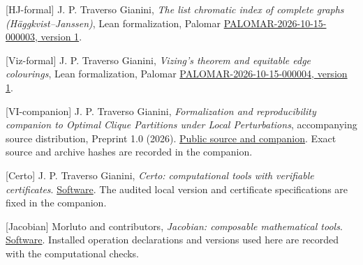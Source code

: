 \documentclass[english,11pt,a4paper]{article}
\begin{document}
{[}HJ-formal{]} J. P. Traverso Gianini, \emph{The list chromatic index
of complete graphs (Häggkvist--Janssen)}, Lean formalization, Palomar
\href{https://palomar-registry.org/entry.html?id=PALOMAR-2026-10-15-000003&version=1}{PALOMAR-2026-10-15-000003,
version 1}.

{[}Viz-formal{]} J. P. Traverso Gianini, \emph{Vizing's theorem and
equitable edge colourings}, Lean formalization, Palomar
\href{https://palomar-registry.org/entry.html?id=PALOMAR-2026-10-15-000004&version=1}{PALOMAR-2026-10-15-000004,
version 1}.

{[}VI-companion{]} J. P. Traverso Gianini, \emph{Formalization and
reproducibility companion to Optimal Clique Partitions under Local
Perturbations}, accompanying source distribution, Preprint 1.0 (2026).
\href{https://github.com/jtraverso/erdos-81-chordal-clique-partitions/tree/main/preprints/PAPER_VI/05_formalization}{Public
source and companion}. Exact source and archive hashes are recorded in
the companion.

{[}Certo{]} J. P. Traverso Gianini, \emph{Certo: computational tools
with verifiable certificates}.
\href{https://github.com/jtraverso/certo-math}{Software}. The audited
local version and certificate specifications are fixed in the companion.

{[}Jacobian{]} Morluto and contributors, \emph{Jacobian: composable
mathematical tools}.
\href{https://github.com/morluto/jacobian}{Software}. Installed
operation declarations and versions used here are recorded with the
computational checks.
\end{document}
